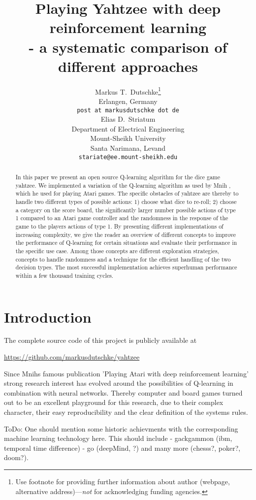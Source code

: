 \documentclass{article}
\title{Playing Yahtzee with deep reinforcement learning\\- a systematic comparison of different approaches}
\author{
  Markus T.~Dutschke\thanks{Use footnote for providing further
    information about author (webpage, alternative
    address)---\emph{not} for acknowledging funding agencies.} \\
  Erlangen, Germany\\
  \texttt{post at markusdutschke dot de} \\
   \And
 Elias D.~Striatum \\
  Department of Electrical Engineering\\
  Mount-Sheikh University\\
  Santa Narimana, Levand \\
  \texttt{stariate@ee.mount-sheikh.edu} \\
}
\begin{document}
\maketitle

\begin{abstract}
In this paper we present an open source Q-learning algorithm for the dice game yahtzee.
We implemented a variation of the Q-learning algorithm as used by Mnih \cite{mnih13},
which he used for playing Atari games.
The specific obstacles of yahtzee are thereby
to handle two different types of possible actions:
  1) choose what dice to re-roll;
  2) choose a category on the score board,
the significantly larger number possible actions of type 1 compared to an Atari game controller
and
the randomness in the response of the game to the players actions of type 1.
By presenting different implementations of increasing complexity,
we give the reader an overview of different concepts to improve the performance of Q-learning
for certain situations and evaluate their performance in the specific use case.
Among those concepts are different exploration strategies, concepts to handle randomness and
a technique for the efficient handling of the two decision types.
The most successful implementation achieves superhuman performance within a few thousand training cycles.
\end{abstract}




\section{Introduction}

The complete source code of this project is publicly available at
\begin{center}
  \url{https://github.com/markusdutschke/yahtzee}
\end{center}

Since Mnihs famous publication 'Playing Atari with deep reinforcement learning' \cite{mnih13}
strong research interest has evolved around the possibilities of Q-learning in combination with neural networks.
Thereby computer and board games turned out to be an excellent playground for this research,
due to their complex character, their easy reproducibility and the clear definition of the systems rules.

ToDo: One should mention some historic achievments with the corresponding machine learning technology here.
This should include
- gackgammon (ibm, temporal time difference)
- go (deepMind, ?)
and many more (chesss?, poker?, doom?).
\end{document}
